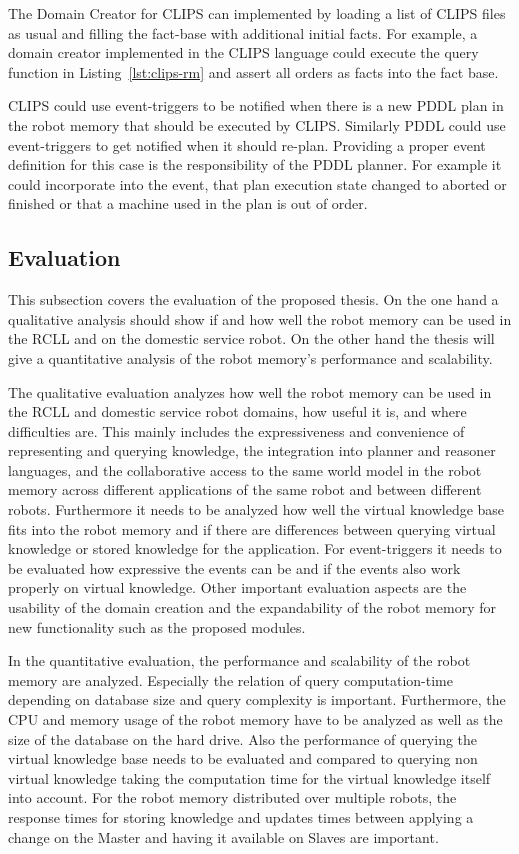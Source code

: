 \documentclass[a4paper,11pt]{article}
\newcommand{\reflst}[1]{Listing~\ref{#1}}
\begin{document}
The Domain Creator for CLIPS can implemented by loading a list of
CLIPS files as usual and filling the fact-base with additional initial
facts. For example, a domain creator implemented in the CLIPS language
could execute the query function in \reflst{lst:clips-rm} and assert
all orders as facts into the fact base.

CLIPS could use event-triggers to be notified when there is a new PDDL
plan in the robot memory that should be executed by CLIPS. Similarly
PDDL could use event-triggers to get notified when it should
re-plan. Providing a proper event definition for this case is the
responsibility of the PDDL planner. For example it could incorporate into the
event, that plan execution state changed to aborted or finished or
that a machine used in the plan is out of order.

\subsection{Evaluation}
\label{sec:eval}
This subsection covers the evaluation of the proposed thesis. On the
one hand a qualitative analysis should show if and how well the robot
memory can be used in the RCLL and on the domestic service robot.
On the other hand the thesis will give a quantitative
analysis of the robot memory's performance and scalability.

The qualitative evaluation analyzes how well the robot memory can be
used in the RCLL and domestic service robot domains, how useful it is,
and where difficulties are. This mainly includes the expressiveness
and convenience of representing and querying knowledge, the
integration into planner and reasoner languages, and the collaborative
access to the same world model in the robot memory across different
applications of the same robot and between different
robots. Furthermore it needs to be analyzed how well the virtual
knowledge base fits into the robot memory and if there are differences
between querying virtual knowledge or stored knowledge for the
application. For event-triggers it needs to be evaluated how
expressive the events can be and if the events also work properly on
virtual knowledge. Other important evaluation aspects are the
usability of the domain creation and the expandability of the robot
memory for new functionality such as the proposed modules.

In the quantitative evaluation, the performance and scalability of the
robot memory are analyzed. Especially the relation of query
computation-time depending on database size and query complexity is
important. Furthermore, the CPU and memory usage of the robot memory
have to be analyzed as well as the size of the database on the hard
drive. Also the performance of querying the virtual knowledge base
needs to be evaluated and compared to querying non virtual knowledge
taking the computation time for the virtual knowledge itself into
account. For the robot memory distributed over multiple robots, the
response times for storing knowledge and updates times between
applying a change on the Master and having it available on Slaves are
important.
\end{document}

